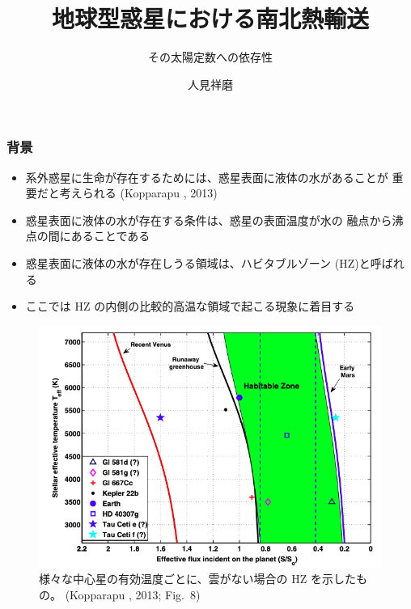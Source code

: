 \documentclass[aspectratio=149,9pt,fleqn]{beamer}
\institute{北海道大学大学院理学院 地球流体力学研究室 M2}
\author{人見祥磨}
\title{地球型惑星における南北熱輸送}
\subtitle{その太陽定数への依存性}
\begin{document}
\maketitle

\begin{frame}
	\frametitle{背景}
	\begin{itemize}
		\item 系外惑星に生命が存在するためには、惑星表面に液体の水があることが
			重要だと考えられる (Kopparapu \etal*, 2013)
		\item 惑星表面に液体の水が存在する条件は、惑星の表面温度が水の
			融点から沸点の間にあることである
		\item 惑星表面に液体の水が存在しうる領域は、ハビタブルゾーン (HZ)と呼ばれる
		\item ここでは HZ の内側の比較的高温な領域で起こる現象に着目する
	\end{itemize}
	\begin{figure}
		\centering\scriptsize
		\includegraphics[width=.5\textwidth]{kopparapu8.png}\\
		様々な中心星の有効温度ごとに、雲がない場合の HZ を示したもの。
		(Kopparapu \etal*, 2013; Fig.\ 8)
	\end{figure}
\end{frame}
\end{document}
